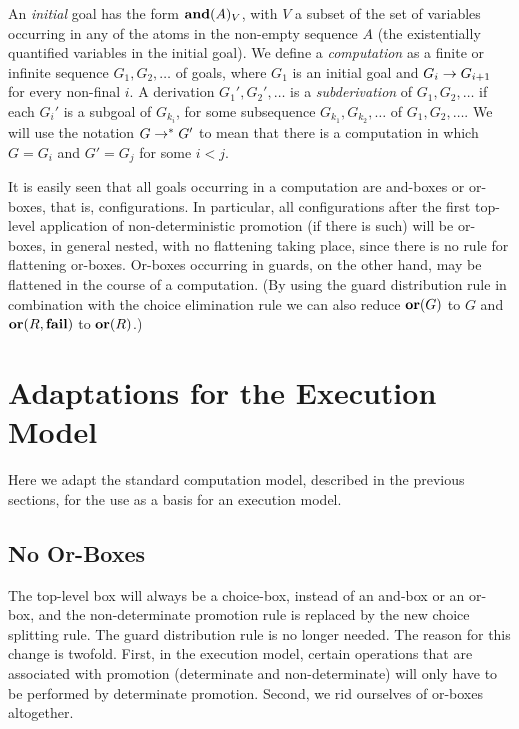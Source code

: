 An {\em initial} goal has the form $\mbox{\bf and}(A)_V$, with $V$ a subset of
the set of variables occurring in any of the atoms in the non-empty
sequence $A$ (the existentially quantified variables in the initial
goal). We define a {\em computation} as a finite or infinite sequence
$G_1,G_2,\dots$ of goals, where $G_1$ is an initial goal and $G_i
\rightarrow G_{i+1}$ for every non-final $i$. A derivation
$G_1',G_2',\dots$ is a {\em subderivation} of $G_1,G_2,\dots$ if each
$G_i'$ is a subgoal of $G_{k_i}$, for some subsequence
$G_{k_1},G_{k_2},\dots$ of $G_1,G_2,\dots$.  We will use the notation
$G \rightarrow^* G'$ to mean that there is a computation in which $G=G_i$
and $G'=G_j$ for some $i<j$.

It is easily seen that all goals occurring in a computation are
and-boxes or or-boxes, that is, configurations. In particular, all
configurations after the first top-level application of
non-deterministic promotion (if there is such) will be or-boxes, in
general nested, with no flattening taking place, since there is no
rule for flattening or-boxes. Or-boxes occurring in guards, on the
other hand, may be flattened in the course of a computation.  (By
using the guard distribution rule in combination with the choice
elimination rule we can also reduce $\mbox{\bf or}(G)$ to $G$ and $\mbox{\bf or}(R,\mbox{\bf fail})$
to $\mbox{\bf or}(R)$.)

\section{Adaptations for the Execution Model}
\label{sec:akldefadapt}

Here we adapt the standard computation model, described in the
previous sections, for the use as a basis for an execution model.

\subsection{No Or-Boxes}

The top-level box will always be a choice-box, instead of an and-box
or an or-box, and the non-determinate promotion rule is replaced by
the new choice splitting rule.  The guard distribution rule is no
longer needed.  The reason for this change is twofold.  First, in the
execution model, certain operations that are associated with promotion
(determinate and non-determinate) will only have to be performed by
determinate promotion.  Second, we rid ourselves of or-boxes
altogether.

